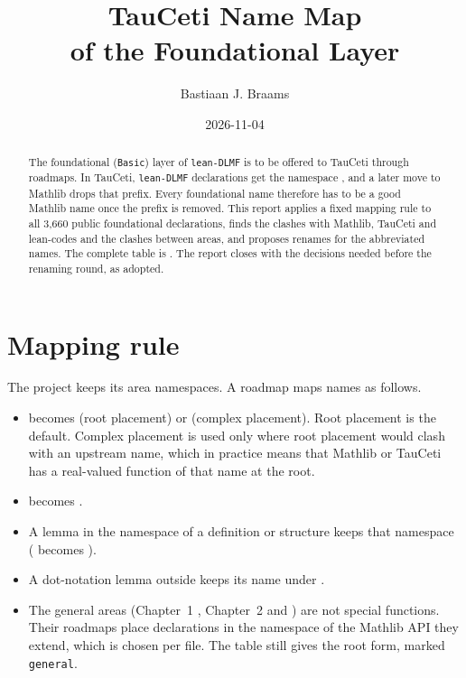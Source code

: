 \documentclass[11pt,a4paper]{article}
\begin{document}
\title{TauCeti Name Map\\of the Foundational Layer}
\author{Bastiaan J. Braams}
\date{2026-11-04}
\maketitle
\sloppy

\begin{abstract}
  The foundational (\texttt{Basic}) layer of \texttt{lean-DLMF} is to be offered to TauCeti
  through roadmaps. In TauCeti, \texttt{lean-DLMF} declarations get the namespace
  , and a later move to Mathlib drops that prefix. Every foundational name
  therefore has to be a good Mathlib name once the 
  prefix is removed. This report applies a fixed mapping rule to all 3,660 public
  foundational declarations, finds the clashes with Mathlib, TauCeti and lean-codes and the
  clashes between areas, and proposes renames for the abbreviated names. The complete table
  is . The report closes with the decisions needed before
  the renaming round, as adopted.
\end{abstract}

\section{Mapping rule}

The project keeps its area namespaces. A roadmap maps names as follows.
\begin{itemize}
  \item {} becomes  (root placement) or
     (complex placement). Root placement is the default. Complex
    placement is used only where root placement would clash with an upstream name, which in
    practice means that Mathlib or TauCeti has a real-valued function of that name at the root.
  \item {} becomes .
  \item A lemma in the namespace of a definition or structure keeps that namespace
    ( becomes ).
  \item A dot-notation lemma outside  keeps its name under .
  \item The general areas (Chapter~1 , Chapter~2
     and ) are not special functions. Their
    roadmaps place declarations in the namespace of the Mathlib API they extend, which is
    chosen per file. The table still gives the root form, marked \texttt{general}.
\end{itemize}
\end{document}
